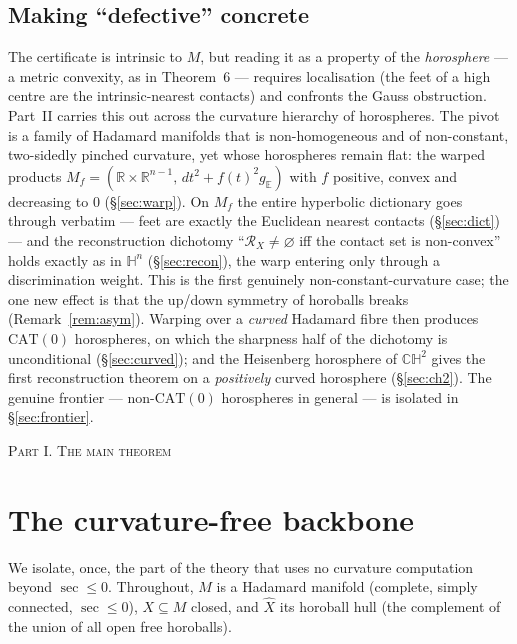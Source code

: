\documentclass[11pt]{article}
\theoremstyle{remark}
\newcommand{\R}{\mathbb{R}}
\newcommand{\X}{X}
\newcommand{\Xhat}{\widehat{\X}}
\newcommand{\Rx}{\mathcal{R}_{\X}}
\newcommand{\Mf}{M_{f}}
\newcommand{\E}{\mathbb{E}}
\newcommand{\HH}{\mathbb{H}}
\begin{document}
\subsection*{Making ``defective'' concrete}

The certificate is intrinsic to $M$, but reading it as a property of
the \emph{horosphere} --- a metric convexity, as in Theorem~6 ---
requires localisation (the feet of a high centre are the
intrinsic-nearest contacts) and confronts the Gauss obstruction.
Part~II carries this out across the curvature hierarchy of horospheres.
The pivot is a family of Hadamard manifolds that is non-homogeneous and
of non-constant, two-sidedly pinched curvature, yet whose horospheres
remain flat: the warped products
$\Mf=(\R\times\R^{n-1},\,dt^{2}+f(t)^{2}g_{\E})$ with $f$ positive,
convex and decreasing to $0$ (\S\ref{sec:warp}). On $\Mf$ the entire
hyperbolic dictionary goes through verbatim --- feet are exactly the
Euclidean nearest contacts (\S\ref{sec:dict}) --- and the
reconstruction dichotomy ``$\Rx\neq\varnothing$ iff the contact set is
non-convex'' holds exactly as in $\HH^{n}$ (\S\ref{sec:recon}), the
warp entering only through a discrimination weight. This is the first
genuinely non-constant-curvature case; the one new effect is that the
up/down symmetry of horoballs breaks (Remark~\ref{rem:asym}). Warping
over a \emph{curved} Hadamard fibre then produces $\mathrm{CAT}(0)$
horospheres, on which the sharpness half of the dichotomy is
unconditional (\S\ref{sec:curved}); and the Heisenberg horosphere of
$\mathbb{CH}^{2}$ gives the first reconstruction theorem on a
\emph{positively} curved horosphere (\S\ref{sec:ch2}). The genuine
frontier --- non-$\mathrm{CAT}(0)$ horospheres in general --- is
isolated in \S\ref{sec:frontier}.

\bigskip
\begin{center}\textsc{Part I. The main theorem}\end{center}

\section{The curvature-free backbone}\label{sec:backbone}

We isolate, once, the part of the theory that uses no curvature
computation beyond $\sec\le0$. Throughout, $M$ is a Hadamard manifold
(complete, simply connected, $\sec\le0$), $\X\subseteq M$ closed, and
$\Xhat$ its horoball hull (the complement of the union of all open
free horoballs).
\end{document}
